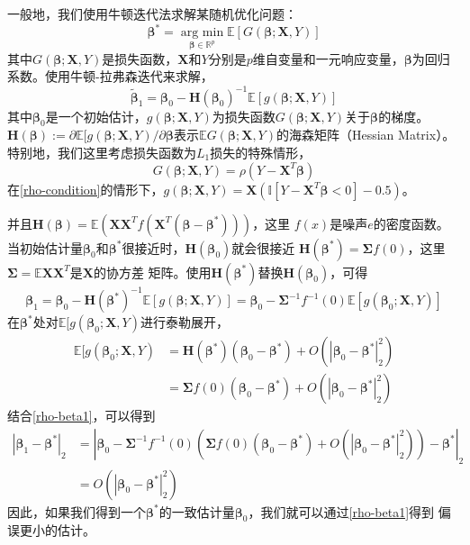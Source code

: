 一般地，我们使用牛顿迭代法求解某随机优化问题：
\begin{equation}\label{randomversion}
    \bm{\beta}^* = \underset{\bm{\beta} \in \mathbb{R}^{p}}{\operatorname{arg\ min}} \mathbb{E}[G(\bm{\beta};\bm{X},Y)]
\end{equation}
其中$G(\bm{\beta};\bm{X}, Y)$是损失函数，$\bm{X}$和$Y$分别是$p$维自变量和一元响应变量，$\bm{\beta}$为回归系数。使用牛顿-拉弗森迭代来求解，
\begin{equation}
    \tilde{\bm{\beta}}_1 = \bm{\beta}_0 - \bm{H}(\bm{\beta}_0)^{-1}\mathbb{E}[g(\bm{\beta};\bm{X},Y)]
\end{equation}
其中$\bm{\beta}_0$是一个初始估计，$g(\bm{\beta};\bm{X},Y)$为损失函数$G(\bm{\beta};\bm{X},Y)$关于$\bm{\beta}$的梯度。\\
$\bm{H}(\bm{\beta}):=\partial\mathbb{E}[g(\bm{\beta};\bm{X},Y)
/\partial\bm{\beta}$表示$\mathbb{E}G(\bm{\beta};\bm{X},Y)$的海森矩阵（Hessian Matrix）。特别地，我们这里考虑损失函数为$L_1$损失的特殊情形，
\begin{equation}\label{rho-condition}
    G(\bm{\beta};\bm{X},Y) = \rho(Y - \bm{X}^T\bm{\beta})
\end{equation}
在\eqref{rho-condition}的情形下，$g(\bm{\beta};\bm{X},Y) = \bm{X}(\mathbb{I}[Y - \bm{X}^T\bm{\beta} < 0] - 0.5)$。

并且$\bm{H}(\bm{\beta}) = \mathbb{E}(\bm{X}\bm{X}^Tf(\bm{X}^T(\bm{\beta} - \bm{\beta}^*)))$，这里
$f(x)$是噪声$e$的密度函数。当初始估计量$\bm{\beta}_0$和$\bm{\beta}^*$很接近时，$\bm{H}(\bm{\beta}_0)$就会很接近
$\bm{H}(\bm{\beta}^*) = \bm{\Sigma}f(0)$，这里$\bm{\Sigma} = \mathbb{E}\bm{X}\bm{X}^T$是$\bm{X}$的协方差
矩阵。使用$\bm{H}(\bm{\beta}^*)$替换$\bm{H}(\bm{\beta}_0)$，可得
\begin{equation}\label{rho-beta1}
    \bm{\beta}_1 = \bm{\beta}_0 - \bm{H}(\bm{\beta}^*)^{-1}\mathbb{E}[g(\bm{\beta};\bm{X}, Y)]
    = \bm{\beta}_0 - \bm{\Sigma}^{-1}f^{-1}(0)\mathbb{E}[g(\bm{\beta}_0;\bm{X},Y)]
\end{equation}
在$\bm{\beta}^*$处对$\mathbb{E}[g(\bm{\beta}_0;\bm{X},Y)$进行泰勒展开，
\begin{equation*}
    \begin{split}
\mathbb{E}[g(\bm{\beta}_0;\bm{X},Y) &= \bm{H}(\bm{\beta}^*)(\bm{\beta}_0 - \bm{\beta}^*) + O(|\bm{\beta}_0 - \bm{\beta}^*|_2^2) \\
 &= \bm{\Sigma}f(0)(\bm{\beta}_0 - \bm{\beta}^*) + O(|\bm{\beta}_0 - \bm{\beta}^*|_2^2)
    \end{split}
\end{equation*}
结合\eqref{rho-beta1}，可以得到
\begin{equation*}
    \begin{split}
        |\bm{\beta}_1 - \bm{\beta}^*|_2 &=  |\bm{\beta}_0 - \bm{\Sigma}^{-1}f^{-1}(0)(
            \bm{\Sigma}f(0)(\bm{\beta}_0 - \bm{\beta}^*) + O(|\bm{\beta}_0 - \bm{\beta}^*|_2^2)
        ) - \bm{\beta}^*|_2\\
        &= O(|\bm{\beta}_0 - \bm{\beta}^*|_2^2)
    \end{split}
\end{equation*}
因此，如果我们得到一个$\bm{\beta}^*$的一致估计量$\bm{\beta}_0$，我们就可以通过\eqref{rho-beta1}得到
偏误更小的估计。

